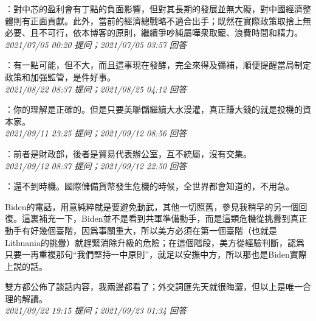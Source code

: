 \documentclass[twocolumn]{ctexart}
\begin{document}
：對中芯的盈利會有丁點的負面影響，但對其長期的發展並無大礙，對中國經濟整體則有正面貢獻。此外，當前的經濟總戰略不適合出手；既然在實際政策取捨上無必要、且不可行，依本博客的原則，繼續爭吵純屬嘩衆取寵、浪費時間和精力。
\\

\textit{\hfill\noindent\small 2021/07/05 00:20 提问；2021/07/05 03:57 回答}

：有一點可能，但不大，而且這事現在發酵，完全來得及彌補，順便提醒當局制定政策和加强監管，是件好事。
\\

\textit{\hfill\noindent\small 2021/08/22 08:37 提问；2021/08/25 04:12 回答}

：你的理解是正確的。但是只要美聯儲繼續大水漫灌，真正賺大錢的就是投機的資本家。
\\

\textit{\hfill\noindent\small 2021/09/11 23:25 提问；2021/09/12 08:56 回答}

：前者是財政部，後者是貿易代表辦公室，互不統屬，沒有交集。
\\

\textit{\hfill\noindent\small 2021/09/12 08:37 提问；2021/09/12 22:50 回答}

：還不到時機。國際儲備貨幣發生危機的時候，全世界都會知道的，不用急。

Biden的電話，用意純粹就是要避免動武，其他一切照舊，參見我稍早的另一個回復。這裏補充一下，Biden並不是看到共軍準備動手，而是這類危機從挑釁到真正動手有好幾個臺階，因爲事關重大，所以美方必須在第一個臺階（也就是Lithuania的挑釁）就趕緊消除升級的危險；在這個階段，美方從經驗判斷，認爲只要一再重複那句“我們堅持一中原則”，就足以安撫中方，所以那也是Biden實際上説的話。

雙方都公佈了談話内容，我兩邊都看了；外交詞匯先天就很晦澀，但以上是唯一合理的解讀。
\\

\textit{\hfill\noindent\small 2021/09/22 19:15 提问；2021/09/23 01:34 回答}
\end{document}

